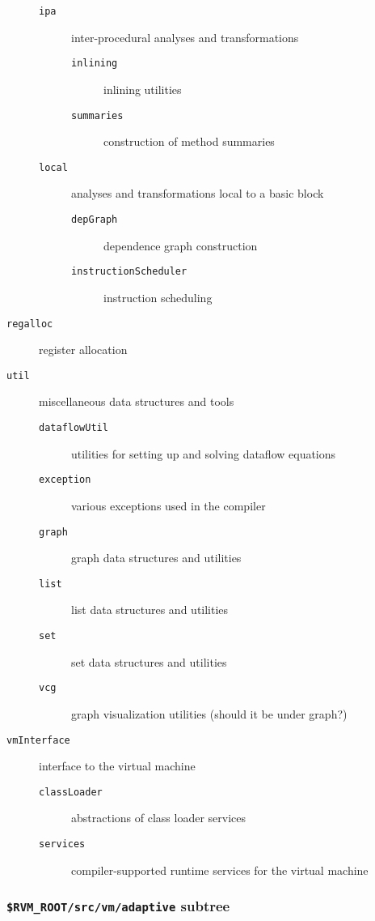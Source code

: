 \begin{description}
\begin{description}
\begin{description}
      \end{description}
   \item [{\tt ipa}] inter-procedural analyses and transformations
      \begin{description}
      \item [{\tt inlining}] inlining utilities
      \item [{\tt summaries}] construction of method summaries
      \end{description}
   \item [{\tt local}] analyses and transformations local to a basic block
      \begin{description}
      \item [{\tt depGraph}] dependence graph construction
      \item [{\tt instructionScheduler}] instruction scheduling
      \end{description}
   \end{description}
\item [{\tt regalloc}] register allocation
\item [{\tt util}] miscellaneous data structures and tools
   \begin{description}
   \item [{\tt dataflowUtil}] utilities for setting up and solving dataflow equations
   \item [{\tt exception}] various exceptions used in the compiler
   \item [{\tt graph}] graph data structures and utilities
   \item [{\tt list}] list data structures and utilities
   \item [{\tt set}] set data structures and utilities
   \item [{\tt vcg}] graph visualization utilities (should it be under graph?)
   \end{description}
\item [{\tt vmInterface}] interface to the virtual machine
   \begin{description}
   \item [{\tt classLoader}] abstractions of class loader services
   \item [{\tt services}] compiler-supported runtime services for the virtual machine
   \end{description}
\end{description}

\subsubsection{{\tt \$RVM\_ROOT/src/vm/adaptive} subtree}

